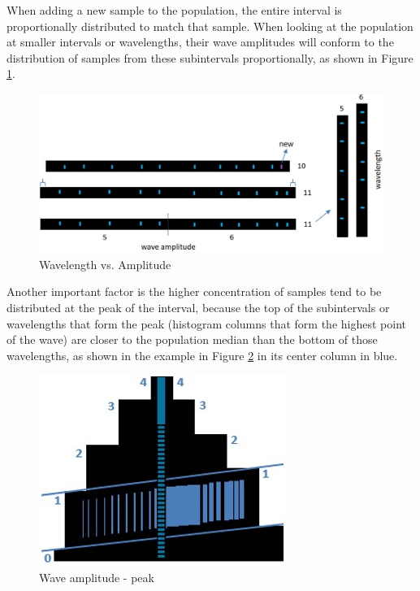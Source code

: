 When adding a new sample to the population, the entire interval is proportionally distributed to match that sample. When looking at the population at smaller intervals or wavelengths, their wave amplitudes will conform to the distribution of samples from these subintervals proportionally, as shown in Figure \ref{fig:consciousness_space_volume_amplitude}.
	\begin{figure}[H]
	\caption{Wavelength vs. Amplitude}
	\label{fig:consciousness_space_volume_amplitude}
	\centering
	\includegraphics[scale=.4]{sections/images/consciousness_space_volume_amplitude.jpg}
	\end{figure}
	
Another important factor is the higher concentration of samples tend to be distributed at the peak of the interval, because the top of the subintervals or wavelengths that form the peak (histogram columns that form the highest point of the wave) are closer to the population median than the bottom of those wavelengths, as shown in the example in Figure \ref{fig:consciousness_space_amplitude_growth} in its center column in blue.
	\begin{figure}[H]
	\caption{Wave amplitude - peak}
	\label{fig:consciousness_space_amplitude_growth}
	\centering
	\includegraphics[scale=.6]{sections/images/consciousness_space_amplitude_growth.jpg}
	\end{figure}

